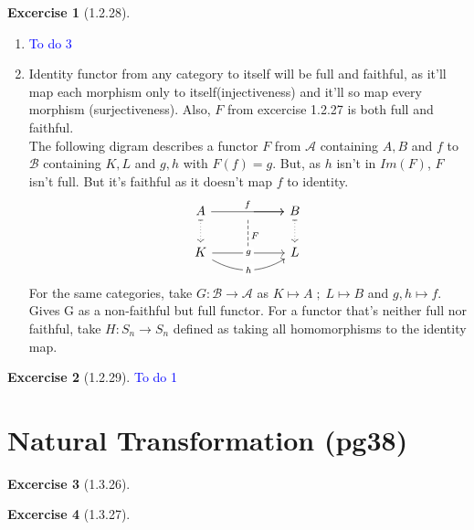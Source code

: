 \documentclass{article}
\theoremstyle{definition}
\newtheorem*{excercise}{Excercise}
\begin{document}
\begin{excercise}[1.2.28] %
	\begin{enumerate}[label=(\alph*)]
		\item \textcolor{blue}{To do 3}
		\item Identity functor from any category to itself will be full and faithful, as it'll map each morphism only to itself(injectiveness) and it'll so map every morphism (surjectiveness).
Also, $F$ from excercise 1.2.27 is both full and faithful. \\
The following digram describes a functor $F$ from $\mathcal{A} $ containing $A,B$ and $f$ to $\mathcal{B} $ containing $K,L$ and $g,h$ with $F(f) = g$. But, as $h$ isn't in $Im(F)$, $F$ isn't full. But it's faithful as it doesn't map $f$ to identity.
\[
\begin{tikzcd}
A \arrow[rr, "f"] \arrow[d, dotted, maps to]                          & {} \arrow[r] \arrow[d, "F", dashed] & B \arrow[d, dotted, maps to] \\
K \arrow[rr, "g" description] \arrow[rr, "h" description, bend right] & {}                                                      & L
\end{tikzcd}\]
For the same categories, take $G:\mathcal{B} \rightarrow \mathcal{A} $ as $K \mapsto A\; ; \; L \mapsto B $
and $g,h \mapsto f $. Gives G as a non-faithful but full functor. For a functor that's neither full nor faithful, take $H: S_n \rightarrow S_n$ defined as taking all homomorphisms to the identity map.

	\end{enumerate}
\end{excercise}


\begin{excercise}[1.2.29] %
		\item \textcolor{blue}{To do 1}
\end{excercise}

\section{Natural Transformation (pg38)}

\begin{excercise}[1.3.26] %

\end{excercise}

\begin{excercise}[1.3.27] %

\end{excercise}
\end{document}
